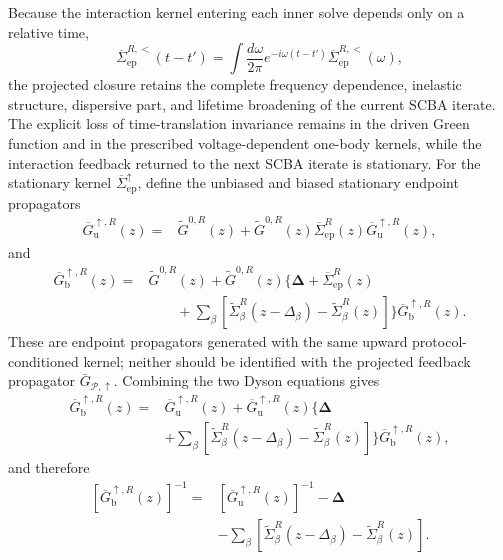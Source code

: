 \documentclass[
 reprint,
 superscriptaddress,
 amsmath,amssymb,
 aps,prb,
 longbibliography,
 floatfix
]{revtex4-2}
\newcommand{\ep}{\mathrm{ep}}
\newcommand{\barSigma}{\overline{\Sigma}}
\begin{document}
Because the interaction kernel entering each inner solve depends only on a relative time,
\begin{equation*}
\barSigma_{\ep}^{R,<}(t-t')
=
\int\frac{d\omega}{2\pi}
e^{-i\omega(t-t')}
\barSigma_{\ep}^{R,<}(\omega),
\end{equation*}
the projected closure retains the complete frequency dependence, inelastic structure, dispersive part, and lifetime broadening of the current SCBA iterate. The explicit loss of time-translation invariance remains in the driven Green function and in the prescribed voltage-dependent one-body kernels, while the interaction feedback returned to the next SCBA iterate is stationary. For the stationary kernel \(\barSigma_{\ep}^{\uparrow}\), define the unbiased and biased stationary endpoint propagators
\begin{equation*}
\begin{aligned}
\overline G_{\mathrm u}^{\uparrow,R}(z)
={}&
\widetilde G^{0,R}(z)
+
\widetilde G^{0,R}(z)
\barSigma_{\ep}^{R}(z)
\overline G_{\mathrm u}^{\uparrow,R}(z),
\end{aligned}
\end{equation*}
and
\begin{equation*}
\begin{aligned}
\overline G_{\mathrm b}^{\uparrow,R}(z)
={}&
\widetilde G^{0,R}(z)
+
\widetilde G^{0,R}(z)
\Bigg\{
\bm\Delta
+
\barSigma_{\ep}^{R}(z)
\\
&\qquad+
\sum_\beta
\left[
\widetilde\Sigma_\beta^R(z-\Delta_\beta)
-
\widetilde\Sigma_\beta^R(z)
\right]
\Bigg\}
\overline G_{\mathrm b}^{\uparrow,R}(z).
\end{aligned}
\end{equation*}
These are endpoint propagators generated with the same upward protocol-conditioned kernel; neither should be identified with the projected feedback propagator \(\bar G_{\mathcal P,\uparrow}\). Combining the two Dyson equations gives
\begin{equation*}
\begin{aligned}
\overline G_{\mathrm b}^{\uparrow,R}(z)
={}&
\overline G_{\mathrm u}^{\uparrow,R}(z)
+
\overline G_{\mathrm u}^{\uparrow,R}(z)
\Bigg\{
\bm\Delta
\\
&+
\sum_\beta
\left[
\widetilde\Sigma_\beta^R(z-\Delta_\beta)
-
\widetilde\Sigma_\beta^R(z)
\right]
\Bigg\}
\overline G_{\mathrm b}^{\uparrow,R}(z),
\end{aligned}
\end{equation*}
and therefore
\begin{equation}
\begin{aligned}
\left[
\overline G_{\mathrm b}^{\uparrow,R}(z)
\right]^{-1}
={}&
\left[
\overline G_{\mathrm u}^{\uparrow,R}(z)
\right]^{-1}
-
\bm\Delta
\\
&-
\sum_\beta
\left[
\widetilde\Sigma_\beta^R(z-\Delta_\beta)
-
\widetilde\Sigma_\beta^R(z)
\right].
\end{aligned}
\label{eq:upward-psscba-inverse-dyson}
\end{equation}
\end{document}
